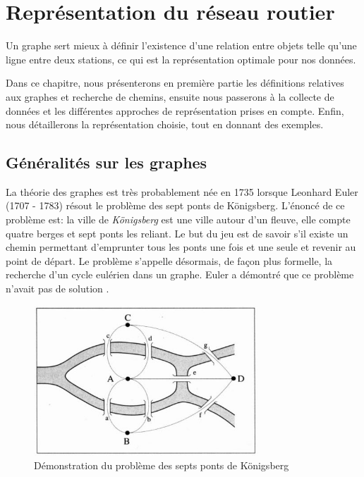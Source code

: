 \chapter{Représentation du réseau routier}
Un graphe sert mieux à définir l'existence d'une relation entre objets telle qu'une ligne entre deux stations, ce qui est la représentation optimale pour nos données. 

Dans ce chapitre, nous présenterons en première partie les définitions relatives aux graphes et recherche de chemins, ensuite nous passerons à la collecte de données et les différentes approches de représentation prises en compte.
Enfin, nous détaillerons la représentation choisie, tout en donnant des exemples.

\section{Généralités sur les graphes}
La théorie des graphes est très probablement née en 1735 lorsque Leonhard Euler (1707 - 1783) résout le problème des sept ponts de Königsberg. 
L'énoncé de ce problème est: la ville de \emph{Königsberg} est une ville autour d'un fleuve, elle compte quatre berges et sept ponts les reliant. Le but du jeu est de savoir s'il existe un chemin permettant d'emprunter tous les ponts une fois et une seule et revenir au point de départ. Le problème s'appelle désormais, de façon plus formelle, la recherche d'un cycle eulérien dans un graphe. Euler a démontré que ce problème n'avait pas de solution \cite{WikiGraphes}.

\begin{figure}[h!]
\center
\includegraphics[width=0.75\textwidth]{img/Bridges.jpg}
\caption{Démonstration du problème des septs ponts de Königsberg}
\end{figure}

